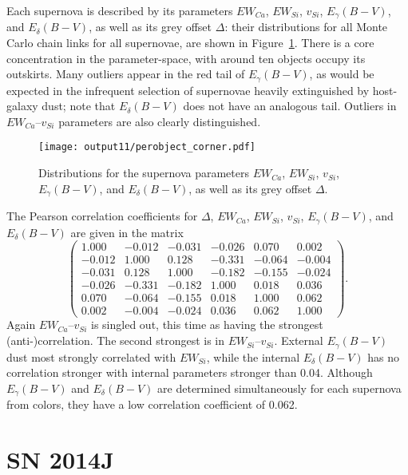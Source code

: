 \documentclass{aastex}   	%
\begin{document}
Each supernova is described by its parameters $EW_{Ca}$, $EW_{Si}$, $v_{Si}$, $E_\gamma(B-V)$, and $E_\delta(B-V)$, as well as its grey offset
$\Delta$: their distributions for all Monte Carlo chain links for all supernovae, are shown in Figure~\ref{perobject:fig}.
There is a core concentration in the  parameter-space, with around ten objects occupy its outskirts.
Many outliers appear in the red tail of $E_\gamma(B-V)$, as would be expected in the infrequent selection of supernovae
heavily extinguished by host-galaxy dust; note that $E_\delta(B-V)$ does not have an analogous tail.
Outliers in  $EW_{Ca}$--$v_{Si}$ parameters are also clearly distinguished.

\begin{figure}[htbp] %
   \centering
   \texttt{[image: output11/perobject\_corner.pdf]} 
   \caption{Distributions for the supernova parameters $EW_{Ca}$, $EW_{Si}$, $v_{Si}$, $E_\gamma(B-V)$, and $E_\delta(B-V)$, as well as its grey offset
$\Delta$.
   \label{perobject:fig}}
\end{figure}

The Pearson correlation coefficients for $\Delta$, $EW_{Ca}$, $EW_{Si}$, $v_{Si}$, $E_\gamma(B-V)$, and $E_\delta(B-V)$ are given in the matrix
\begin{equation}
\begin{pmatrix}
1.000 & -0.012 & -0.031 & -0.026 & 0.070 & 0.002 \\
-0.012 & 1.000 & 0.128 & -0.331 & -0.064 & -0.004 \\
-0.031 & 0.128 & 1.000 & -0.182 & -0.155 & -0.024 \\
-0.026 & -0.331 & -0.182 & 1.000 & 0.018 & 0.036 \\
0.070 & -0.064 & -0.155 & 0.018 & 1.000 & 0.062 \\
0.002 & -0.004 & -0.024 & 0.036 & 0.062 & 1.000
\end{pmatrix}.
\end{equation}
Again  $EW_{Ca}$--$v_{Si}$ is singled out, this time as having the strongest (anti-)correlation.  The second strongest is in
$EW_{Si}$--$v_{Si}$.
External $E_\gamma(B-V)$ dust most strongly correlated with $EW_{Si}$, while the internal $E_\delta(B-V)$  has no correlation stronger with internal parameters stronger than
0.04.  Although $E_\gamma(B-V)$ and $E_\delta(B-V)$ are determined simultaneously for each supernova from colors, they have a low correlation coefficient of 0.062.

\section{SN 2014J}
\label{sn2014j:sec}
\end{document}
